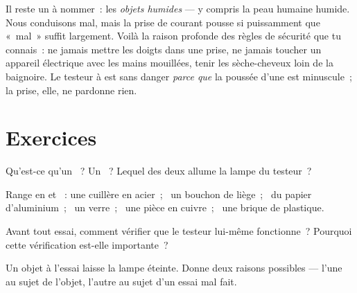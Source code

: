 \begin{remark}\label{rem:g4:conductors-insulators:safety}
Il reste un  à nommer~: les \emph{objets humides} --- y
compris la peau humaine humide. Nous conduisons mal, mais la prise de
courant pousse si puissamment que «~mal~» suffit largement. Voilà la
raison profonde des règles de sécurité que tu connais~: ne jamais
mettre les doigts dans une prise, ne jamais toucher un appareil
électrique avec les mains mouillées, tenir les sèche-cheveux loin de
la baignoire. Le testeur à  est sans danger \emph{parce que} la
poussée d'une  est minuscule~; la prise, elle, ne pardonne rien.
\end{remark}

\section{Exercices}

\begin{exercise}[$\star$]\label{exo:g4:conductors-insulators:1}
Qu'est-ce qu'un ~? Un ~? Lequel des deux allume la
lampe du testeur~?
\end{exercise}

\begin{exercise}[$\star$]\label{exo:g4:conductors-insulators:2}
Range en  et ~: une cuillère en acier~; \ un
bouchon de liège~; \ du papier d'aluminium~; \ un verre~; \ une pièce
en cuivre~; \ une brique de plastique.
\end{exercise}

\begin{exercise}[$\star$]\label{exo:g4:conductors-insulators:3}
Avant tout essai, comment vérifier que le testeur lui-même
fonctionne~? Pourquoi cette vérification est-elle importante~?
\end{exercise}

\begin{exercise}[$\star$]\label{exo:g4:conductors-insulators:4}
Un objet à l'essai laisse la lampe éteinte. Donne deux raisons
possibles --- l'une au sujet de l'objet, l'autre au sujet d'un essai
mal fait.
\end{exercise}

